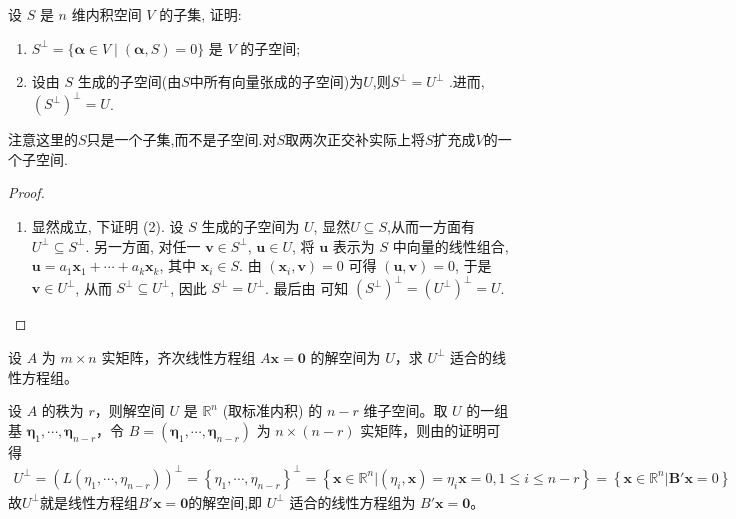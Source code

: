 \documentclass[../../main.tex]{subfiles}%
\begin{document}
\begin{proposition}\label{proposition:例9.19}
设 $S$ 是 $n$ 维内积空间 $V$ 的子集, 证明:
\begin{enumerate}[(1)]
\item $S^\perp = \{ \boldsymbol{\alpha} \in V \mid (\boldsymbol{\alpha}, S) = 0\}$ 是 $V$ 的子空间;
\item 设由 $S$ 生成的子空间(由$S$中所有向量张成的子空间)为$U$,则$S^\perp=U^\perp$ .进而,$(S^\perp)^\perp=U$.
\end{enumerate}
\end{proposition}
\begin{remark}
注意这里的$S$只是一个子集,而不是子空间.对$S$取两次正交补实际上将$S$扩充成$V$的一个子空间.
\end{remark}
\begin{proof}
\begin{enumerate}[(1)]
\item 显然成立, 下证明 (2). 设 $S$ 生成的子空间为 $U$, 显然$U\subseteq S$,从而一方面有 $U^\perp \subseteq S^\perp$. 另一方面, 对任一 $\boldsymbol{v} \in S^\perp$, $\boldsymbol{u} \in U$, 将 $\boldsymbol{u}$ 表示为 $S$ 中向量的线性组合, $\boldsymbol{u} = a_1\boldsymbol{x}_1 + \cdots + a_k\boldsymbol{x}_k$, 其中 $\boldsymbol{x}_i \in S$. 由 $(\boldsymbol{x}_i, \boldsymbol{v}) = 0$ 可得 $(\boldsymbol{u}, \boldsymbol{v}) = 0$, 于是 $\boldsymbol{v} \in U^\perp$, 从而 $S^\perp \subseteq U^\perp$, 因此 $S^\perp = U^\perp$. 最后由 可知 $(S^\perp)^\perp = (U^\perp)^\perp = U$. 
\end{enumerate} 
\end{proof}

\begin{proposition}\label{proposition:例9.20}
设 $A$ 为 $m \times n$ 实矩阵，齐次线性方程组 $A\boldsymbol{x} = \boldsymbol{0}$ 的解空间为 $U$，求 $U^{\perp}$ 适合的线性方程组。
\end{proposition}
\begin{solution}
设 $A$ 的秩为 $r$，则解空间 $U$ 是 $\mathbb{R}^n$ (取标准内积) 的 $n - r$ 维子空间。取 $U$ 的一组基 $\boldsymbol{\eta}_1, \cdots, \boldsymbol{\eta}_{n - r}$，令 $B = (\boldsymbol{\eta}_1, \cdots, \boldsymbol{\eta}_{n - r})$ 为 $n \times (n - r)$ 实矩阵，则由的证明可得
\begin{align*}
U^{\bot}=\left( L\left( \eta _1,\cdots ,\eta _{n-r} \right) \right) ^{\bot}=\left\{ \eta _1,\cdots ,\eta _{n-r} \right\} ^{\bot}=\left\{ \boldsymbol{x}\in \mathbb{R} ^n|\left( \eta _i,\boldsymbol{x} \right) =\eta _i\boldsymbol{x}=0,1\leqslant i\leqslant n-r \right\} =\left\{ \boldsymbol{x}\in \mathbb{R} ^n|\boldsymbol{B}' \boldsymbol{x}=0 \right\} 
\end{align*}
故$U^{\perp}$就是线性方程组$B'\boldsymbol{x} = \boldsymbol{0}$的解空间,即 $U^{\perp}$ 适合的线性方程组为 $B'\boldsymbol{x} = \boldsymbol{0}$。

\end{solution}
\end{document}
